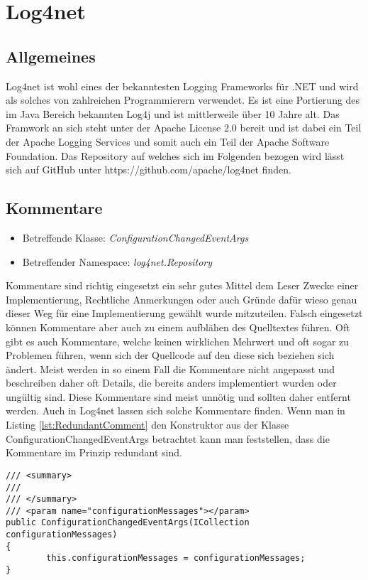 \section{Log4net}
\subsection{Allgemeines}
Log4net ist wohl eines der bekanntesten Logging Frameworks für .NET und wird als solches von zahlreichen Programmierern verwendet. Es ist eine Portierung des im Java Bereich bekannten Log4j und ist mittlerweile über 10 Jahre alt. Das Framwork an sich steht unter der Apache License 2.0 bereit und ist dabei ein Teil der Apache Logging Services und somit auch ein Teil der Apache Software Foundation. Das Repository auf welches sich im Folgenden bezogen wird lässt sich auf GitHub unter https://github.com/apache/log4net finden.

\subsection{Kommentare}
\begin{itemize}
	\item Betreffende Klasse: \textit{ConfigurationChangedEventArgs}
	\item Betreffender Namespace: \textit{log4net.Repository}
\end{itemize}

Kommentare sind richtig eingesetzt ein sehr gutes Mittel dem Leser Zwecke einer Implementierung, Rechtliche Anmerkungen oder auch Gründe dafür wieso genau dieser Weg für eine Implementierung gewählt wurde mitzuteilen. Falsch eingesetzt können Kommentare aber auch zu einem aufblähen des Quelltextes führen. Oft gibt es auch Kommentare, welche keinen wirklichen Mehrwert und oft sogar zu Problemen führen, wenn sich der Quellcode auf den diese sich beziehen sich ändert. Meist werden in so einem Fall die Kommentare nicht angepasst und beschreiben daher oft Details, die bereits anders implementiert wurden oder ungültig sind. Diese Kommentare sind meist unnötig und sollten daher entfernt werden. Auch in Log4net lassen sich solche Kommentare finden. Wenn man in Listing \ref{lst:RedundantComment} den Konstruktor aus der Klasse ConfigurationChangedEventArgs betrachtet kann man feststellen, dass die Kommentare im Prinzip redundant sind.

\begin{lstlisting}[language={[Sharp]C}, caption=Beispiele für überflüssige Kommentare, label=lst:RedundantComment]
/// <summary>
/// 
/// </summary>
/// <param name="configurationMessages"></param>
public ConfigurationChangedEventArgs(ICollection configurationMessages)
{
		this.configurationMessages = configurationMessages;
}
\end{lstlisting}

